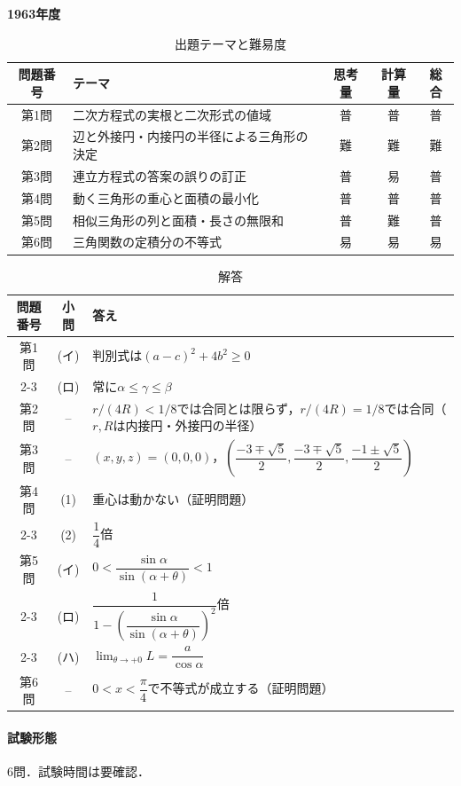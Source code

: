 \documentclass[../../main.tex]{subfiles}
\begin{document}
\begin{center}
  {\fontsize{48pt}{58pt}\selectfont \textbf{1963}\normalsize\textbf{年度}}
\end{center}

\begin{table}[htb]
  \centering
  \caption{出題テーマと難易度}
  \begin{tabular}{|c|p{6.2cm}|c|c|c|}
    \hline
    \textbf{問題番号} & \textbf{テーマ} & \textbf{思考量} & \textbf{計算量} & \textbf{総合} \\
    \hline
    第1問 & 二次方程式の実根と二次形式の値域 & 普 & 普 & 普 \\
    \hline
    第2問 & 辺と外接円・内接円の半径による三角形の決定 & 難 & 難 & 難 \\
    \hline
    第3問 & 連立方程式の答案の誤りの訂正 & 普 & 易 & 普 \\
    \hline
    第4問 & 動く三角形の重心と面積の最小化 & 普 & 普 & 普 \\
    \hline
    第5問 & 相似三角形の列と面積・長さの無限和 & 普 & 難 & 普 \\
    \hline
    第6問 & 三角関数の定積分の不等式 & 易 & 易 & 易 \\
    \hline
  \end{tabular}
\end{table}

\begin{table}[htb]
  \centering
  \caption{解答}
  \renewcommand{\arraystretch}{1.4}
  \begin{tabular}{|c|c|p{9cm}|}
    \hline
    \textbf{問題番号} & \textbf{小問} & \textbf{答え} \\
    \hline
    第1問 & (イ) & 判別式は$(a-c)^2+4b^2\ge0$ \\
    \cline{2-3}
    & (ロ) & 常に$\alpha\le\gamma\le\beta$ \\
    \hline
    第2問 & -- & $r/(4R)<1/8$では合同とは限らず，$r/(4R)=1/8$では合同（$r,R$は内接円・外接円の半径） \\
    \hline
    第3問 & -- & $(x,y,z)=(0,0,0)$，$\left(\dfrac{-3\mp\sqrt{5}}{2},\dfrac{-3\mp\sqrt{5}}{2},\dfrac{-1\pm\sqrt{5}}{2}\right)$ \\
    \hline
    第4問 & (1) & 重心は動かない（証明問題） \\
    \cline{2-3}
    & (2) & $\dfrac{1}{4}$倍 \\
    \hline
    第5問 & (イ) & $0<\dfrac{\sin\alpha}{\sin(\alpha+\theta)}<1$ \\
    \cline{2-3}
    & (ロ) & $\dfrac{1}{1-\left(\dfrac{\sin\alpha}{\sin(\alpha+\theta)}\right)^2}$倍 \\
    \cline{2-3}
    & (ハ) & $\displaystyle\lim_{\theta\to+0}L=\dfrac{a}{\cos\alpha}$ \\
    \hline
    第6問 & -- & $0<x<\dfrac{\pi}{4}$で不等式が成立する（証明問題） \\
    \hline
  \end{tabular}
\end{table}

\paragraph{試験形態}
6問．試験時間は要確認．
\end{document}

